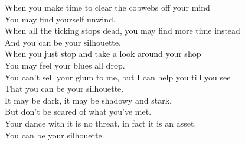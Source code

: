 


When you make time to clear the cobwebs off your mind \\
You may find yourself unwind. \\
When all the ticking stops dead, you may find more time instead \\
And you can be your silhouette. \\

When you just stop and take a look around your shop \\
You may feel your blues all drop. \\
You can't sell your glum to me, but I can help you till you see \\
That you can be your silhouette. \\

It may be dark, it may be shadowy and stark. \\
But don't be scared of what you've met. \\
Your dance with it is no threat, in fact it is an asset. \\
You can be your silhouette. \\




